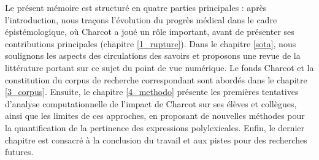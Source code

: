 Le présent mémoire est structuré en quatre parties principales : après l'introduction, nous traçons l'évolution du progrès médical dans le cadre épistémologique, où Charcot a joué un rôle important, avant de présenter ses contributions principales (chapitre \ref{1_rupture}). Dans le chapitre \ref{sota}, nous soulignons les aspects des circulations des savoirs et proposons une revue de la littérature portant sur ce sujet du point de vue numérique. Le fonds Charcot et la constitution du corpus de recherche correspondant sont abordés dans le chapitre \ref{3_corpus}. Ensuite, le chapitre \ref{4_methodo} présente les premières tentatives d'analyse computationnelle de l'impact de Charcot sur ses élèves et collègues, ainsi que les limites de ces approches, en proposant de nouvelles méthodes pour la quantification de la pertinence des expressions polylexicales. Enfin, le dernier chapitre est consacré à la conclusion du travail et aux pistes pour des recherches futures.










